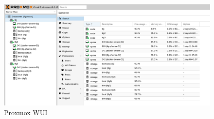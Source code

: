 \begin{text}
\begin{itemize}
                                \begin{figure}[!hbt]
                                        \centering
                                        \includegraphics[scale=0.355]{imagenes/Diseno/proxmox_wui.png}
                                        \caption[Proxmox WUI]{Proxmox WUI} 
                                        \label{Proxmox WUI}
                                \end{figure}
                        \end{itemize}
 
                \end{text}
